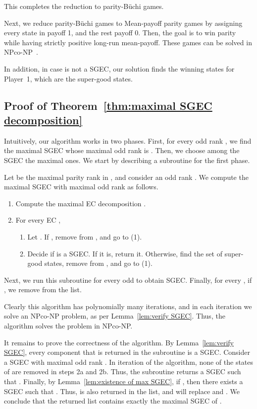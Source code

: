 \documentclass[runningheads,a4paper]{llncs}
\newcommand{\buchi}{B\"uchi\xspace}
\newcommand{\sgec}{{SGEC}\xspace}
\begin{document}
This completes the reduction to parity-\buchi games.

Next, we reduce parity-\buchi games to Mean-payoff parity games by assigning every state in  payoff 1, and the rest payoff 0. Then, the goal is to win parity while having strictly positive long-run mean-payoff. These games can be solved in NPco-NP~\cite{CD11}.

In addition, in case  is not a \sgec, our solution finds the winning states for Player~1, which are the super-good states.


\subsection{Proof of Theorem~\ref{thm:maximal SGEC decomposition}}
\label{apx:maximal SGEC decomposition}
Intuitively, our algorithm works in two phases. First, for every odd rank , we find the maximal \sgec whose maximal odd rank is . Then, we choose among the \sgec the maximal ones. We start by describing a subroutine for the first phase.

Let  be the maximal parity rank in , and consider an odd rank . We compute the maximal \sgec with maximal odd rank  as follows.
\begin{enumerate}
\item Compute the maximal EC decomposition .
\item For every EC ,
\begin{enumerate}
\item Let . If , remove  from , and go to (1).
\item Decide if  is a \sgec. If it is, return it. Otherwise, find the set  of super-good states, remove  from , and go to (1).
\end{enumerate}
\end{enumerate}
Next, we run this subroutine for every odd  to obtain \sgec . Finally, for every , if , we remove  from the list. 

Clearly this algorithm has polynomially many iterations, and in each iteration we solve an NPco-NP problem, as per Lemma~\ref{lem:verify SGEC}. Thus, the algorithm solves the problem in NPco-NP.

It remains to prove the correctness of the algorithm.
By Lemma~\ref{lem:verify SGEC}, every component that is returned in the subroutine is a \sgec. Consider a \sgec  with maximal odd rank . In iteration  of the algorithm, none of the states of  are removed in steps 2a and 2b. Thus, the subroutine returns a \sgec  such that . Finally, by Lemma~\ref{lem:existence of max SGEC}, if , then there exists a \sgec  such that . Thus,  is also returned in the list, and will replace  and .
We conclude that the returned list contains exactly the maximal \sgec of .
\end{document}
